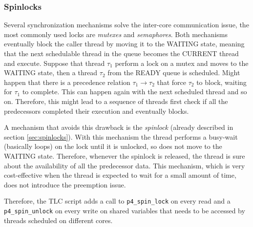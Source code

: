 \subsubsection{Spinlocks}
Several synchronization mechanisms solve the inter-core communication issue, the most commonly used locks are \emph{mutexes} and \emph{semaphores}.%
 Both mechanisms eventually block the caller thread by moving it to the WAITING state, meaning that the next schedulable thread in the queue becomes the CURRENT thread and execute. Suppose that thread $\tau_1$ perform a lock on a mutex and moves to the WAITING state, then a thread $\tau_2$ from the READY queue is scheduled. Might happen that there is a precedence relation $\tau_1\to\tau_2$ that force $\tau_2$ to block, waiting for $\tau_1$ to complete. This can happen again with the next scheduled thread and so on. Therefore, this might lead to a sequence of threads first check if all the predecessors completed their execution and eventually blocks.
\par A mechanism that avoids this drawback is the \emph{spinlock} (already described in section \ref{sec:spinlocks}). With this mechanism the thread performs a busy-wait (basically loops) on the lock until it is unlocked, so does not move to the WAITING state. Therefore, whenever the spinlock is released, the thread is sure about the availability of all the predecessor data. This mechanism, which is very cost-effective when the thread is expected to wait for a small amount of time, does not introduce the preemption issue.
\par Therefore, the TLC script adds a call to \verb|p4_spin_lock| on every read and a \verb|p4_spin_unlock| on every write on shared variables that needs to be accessed by threads scheduled on different cores.

